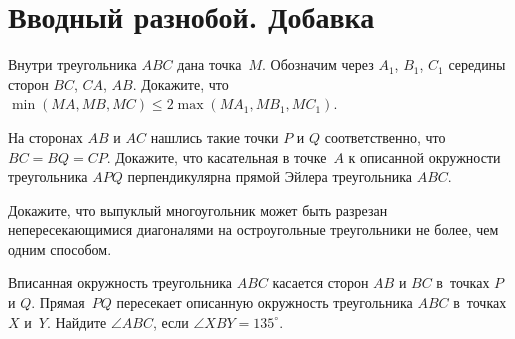 
\section*{Вводный разнобой. Добавка}



\begin{problems}

\item
Внутри треугольника $ABC$ дана точка~$M$.
Обозначим через $A_1$, $B_1$, $C_1$ середины сторон $BC$, $CA$, $AB$.
Докажите, что
\(
    \min(MA, MB, MC)
\leq
    2 \max(M A_1, M B_1, M C_1)
\).

\item
На сторонах $AB$ и $AC$ нашлись такие точки $P$ и $Q$ соответственно, что
$BC = BQ = CP$.
Докажите, что касательная в точке~$A$ к описанной окружности треугольника $APQ$
перпендикулярна прямой Эйлера треугольника $ABC$.

\item
Докажите, что выпуклый многоугольник может быть разрезан непересекающимися
диагоналями на остроугольные треугольники не более, чем одним способом.

\item
Вписанная окружность треугольника $ABC$ касается сторон $AB$ и $BC$ в~точках
$P$ и $Q$.
Прямая~$PQ$ пересекает описанную окружность треугольника $ABC$ в~точках
$X$ и~$Y$.
Найдите $\angle ABC$, если $\angle XBY = 135^{\circ}$.

\end{problems}

